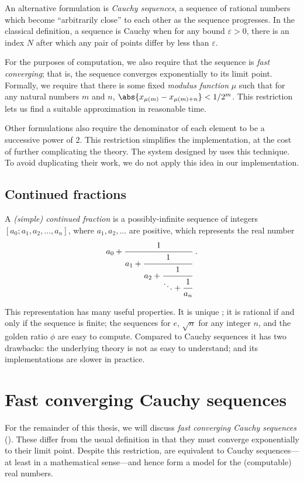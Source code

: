 \documentclass[leqno]{report}
\begin{document}
An alternative formulation is \textit{Cauchy sequences}, a sequence of rational numbers which become ``arbitrarily close'' to each other as the sequence progresses. In the classical definition, a sequence is Cauchy when for any bound $\varepsilon > 0$, there is an index $N$ after which any pair of points differ by less than $\varepsilon$.

For the purposes of computation, we also require that the sequence is \textit{fast converging}; that is, the sequence converges exponentially to its limit point. Formally, we require that there is some fixed \textit{modulus function} $\mu$ such that for any natural numbers $m$ and $n$, $\abs{x_{\mu(m)} - x_{\mu(m)+n}} < 1/2^m$. This restriction lets us find a suitable approximation in reasonable time.

Other formulations also require the denominator of each element to be a successive power of $2$. This restriction simplifies the implementation, at the cost of further complicating the theory. The system designed by \citet{gowland2000correctness} uses this technique. To avoid duplicating their work, we do not apply this idea in our implementation.

\section{Continued fractions}

A \textit{(simple) continued fraction} is a possibly-infinite sequence of integers $[a_0; a_1, a_2, \ldots, a_n]$, where $a_1, a_2, \ldots$ are positive, which represents the real number
\[
    a_0 + \cfrac{1}{a_1 + \cfrac{1}{a_2 + \cfrac{1}{\ddots + \cfrac{1}{a_n}}}}
    \ .
\]

This representation has many useful properties. It is unique \citep{proofwiki2013}; it is rational if and only if the sequence is finite; the sequences for $e$, $\sqrt{n}$ for any integer $n$, and the golden ratio $\phi$ are easy to compute. Compared to Cauchy sequences it has two drawbacks: the underlying theory is not as easy to understand; and its implementations are slower in practice.

\chapter{Fast converging Cauchy sequences}

For the remainder of this thesis, we will discuss \textit{fast converging Cauchy sequences} (\FCCS). These differ from the usual definition in that they must converge exponentially to their limit point. Despite this restriction, \FCCS{} are equivalent to Cauchy sequences---at least in a mathematical sense---and hence form a model for the (computable) real numbers.
\end{document}
